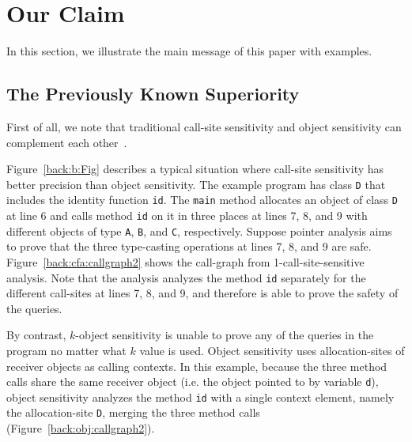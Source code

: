 \section{Our Claim}\label{sec:insight}
In this section, we illustrate the main message of this paper with examples. 



\subsection{The Previously Known Superiority}\label{sec:call-vs-obj}

First of all, we note that traditional call-site sensitivity and
object sensitivity can complement each other~\cite{liang2005evaluating}.



Figure~\ref{back:b:Fig} describes a typical situation where
call-site sensitivity has better precision than object sensitivity.
The example program has class {\tt D} that includes the identity
function {\tt id}. The {\tt main} method allocates an object of class
{\tt D} at line 6
and calls method {\tt id} on it in three places
at lines 7, 8, and 9 with different objects of type {\tt A}, {\tt B},
and {\tt C}, respectively.  Suppose pointer analysis aims to prove
that the three type-casting operations at lines 7, 8, and 9 are safe.
Figure~\ref{back:cfa:callgraph2} shows the call-graph from
1-call-site-sensitive analysis. Note that the analysis analyzes the
method {\tt id} separately for the different call-sites at lines 
7, 8, and 9, and therefore is able to prove the safety of the queries. 


By contrast, $k$-object sensitivity is unable to prove any of the
queries in the program no matter what $k$ value is
used. Object sensitivity uses allocation-sites of receiver objects as
calling contexts. In this example, because the three method calls
share the same receiver object (i.e. the object pointed to by variable
{\tt d}), object sensitivity analyzes the method {\tt id}
with a single context element, namely the allocation-site {\tt D},
merging the three method calls (Figure~\ref{back:obj:callgraph2}).



